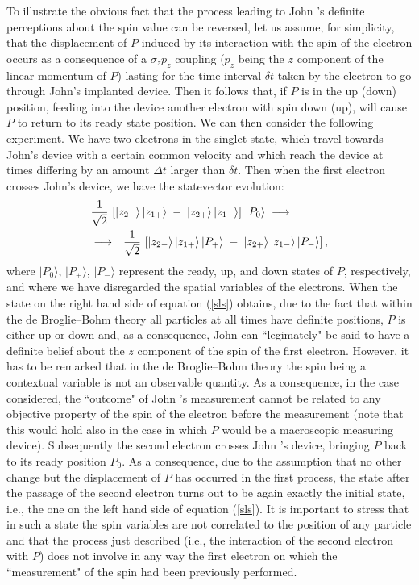 \documentclass[10pt,a4paper]{article}
\begin{document}
To illustrate the obvious fact that the process leading to John 's
definite perceptions about the spin value can be reversed, let us
assume, for simplicity, that the displacement of $P$ induced by
its interaction with the spin of the electron occurs as a
consequence of a $\sigma_{z} p_{z}$ coupling ($p_{z}$ being the
$z$ component of the linear momentum of $P$) lasting for the time
interval $\delta t$ taken by the electron to go through John's
implanted device. Then it follows that, if $P$ is in the up (down)
position, feeding into the device another electron with spin down
(up), will cause $P$ to return to its ready state position. We can
then consider the following experiment. We have two electrons in
the singlet state, which travel towards John's device with a
certain common velocity and which reach the device at times
differing by an amount $\Delta t$ larger than $\delta t$. Then
when the first electron crosses John's device, we have the
statevector evolution:
\begin{eqnarray} \label{sls}
\lefteqn{ \frac{1}{\sqrt{2}}\,\left[ |z_{2-}\rangle\,
|z_{1+}\rangle \; - \; |z_{2+}\rangle\, |z_{1-}\rangle \right]\,
|P_{0}\rangle \;
\longrightarrow \qquad\qquad} \nonumber \\
& \longrightarrow & \frac{1}{\sqrt{2}}\,\left[ |z_{2-}\rangle\,
|z_{1+}\rangle \, |P_{+}\rangle \; - \; |z_{2+}\rangle\,
|z_{1-}\rangle\, |P_{-}\rangle \right],
\end{eqnarray}
where $|P_{0}\rangle$, $|P_{+}\rangle$, $|P_{-}\rangle$ represent
the ready, up, and down states of $P$, respectively, and where we
have disregarded the spatial variables of the electrons. When the
state on the right hand side of equation (\ref{sls}) obtains, due
to the fact that within the de Broglie--Bohm theory all particles
at all times have definite positions, $P$ is either up or down
and, as a consequence, John can ``legimately" be said to have a
definite belief about the $z$ component of the spin of the first
electron. However, it has to be remarked that in the de
Broglie--Bohm theory the spin being a contextual variable is
not an observable quantity. As a consequence, in the case considered, the
``outcome" of John 's measurement cannot be related to any objective
property of the spin of the electron before the measurement (note that
this would hold also in the case in which $P$ would be a macroscopic
measuring device). Subsequently the second electron crosses John
's device, bringing $P$ back to its ready position $P_{0}$. As a
consequence, due to the assumption that no other change but the
displacement of $P$ has occurred in the first process, the state
after the passage of the second electron turns out to be again
exactly the initial state, i.e., the one on the left hand side of
equation (\ref{sls}). It is important to stress that in such a
state the spin variables are not correlated to the position of any
particle and that the process just described (i.e., the
interaction of the second electron with $P$) does not involve in
any way the first electron on which the ``measurement" of the spin
had been previously performed.
\end{document}
